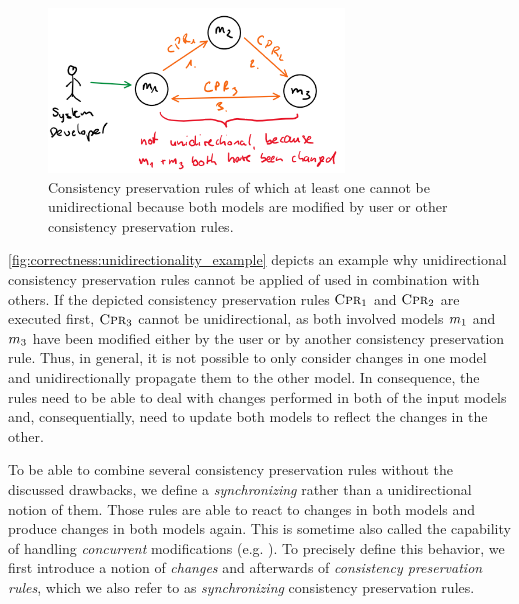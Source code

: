 \begin{figure}
    \centering
    \includegraphics[width=0.7\textwidth]{figures/correctness/notion/not_unidirectional.png}
    \caption[Unidirectional consistency preservation in networks]{Consistency preservation rules of which at least one cannot be unidirectional because both models are modified by user or other consistency preservation rules.}
    \label{fig:correctness:unidirectionality_example}
\end{figure}

\autoref{fig:correctness:unidirectionality_example} depicts an example why unidirectional consistency preservation rules cannot be applied of used in combination with others.
If the depicted consistency preservation rules $\textsc{Cpr}_{1}$ and $\textsc{Cpr}_{2}$ are executed first, $\textsc{Cpr}_{3}$ cannot be unidirectional, as both involved models $m_{1}$ and $m_{3}$ have been modified either by the user or by another consistency preservation rule.
Thus, in general, it is not possible to only consider changes in one model and unidirectionally propagate them to the other model.
In consequence, the rules need to be able to deal with changes performed in both of the input models and, consequentially, need to update both models to reflect the changes in the other.

To be able to combine several consistency preservation rules without the discussed drawbacks, we define a \emph{synchronizing} rather than a unidirectional notion of them.
Those rules are able to react to changes in both models and produce changes in both models again.
This is sometime also called the capability of handling \emph{concurrent} modifications (e.g. \cite{leblebici2014IncrementalTGGSurvey-GTVMT}).
To precisely define this behavior, we first introduce a notion of \emph{changes} and afterwards of \emph{consistency preservation rules}, which we also refer to as \emph{synchronizing} consistency preservation rules.

